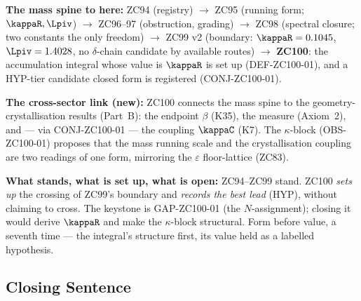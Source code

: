 \documentclass[12pt, a4paper]{article}
\begin{document}
\begin{genealogybox}[title={How ZC100 Sits in the Corpus --- Setting Up the
  Crossing}]
\textbf{The mass spine to here:}
ZC94 (registry) $\to$ ZC95 (running form; $\kappaR,\Lpiv$) $\to$ ZC96--97
(obstruction, grading) $\to$ ZC98 (spectral closure; two constants the only
freedom) $\to$ ZC99 v2 (boundary: $\kappaR=0.1045$, $\Lpiv=1.4028$, no
$\delta$-chain candidate by available routes) $\to$ \textbf{ZC100}: the
accumulation integral whose value is $\kappaR$ is set up (DEF-ZC100-01), and a
HYP-tier candidate closed form is registered (CONJ-ZC100-01).

\textbf{The cross-sector link (new):}
ZC100 connects the mass spine to the geometry-crystallisation results (Part~B):
the endpoint $\beta$ (K35), the measure (Axiom~2), and --- via CONJ-ZC100-01 ---
the coupling $\kappaC$ (K7). The $\kappa$-block (OBS-ZC100-01) proposes that the
mass running scale and the crystallisation coupling are two readings of one
form, mirroring the $\varepsilon$ floor-lattice (ZC83).

\textbf{What stands, what is set up, what is open:}
ZC94--ZC99 stand. ZC100 \emph{sets up} the crossing of ZC99's boundary and
\emph{records the best lead} (HYP), without claiming to cross. The keystone is
GAP-ZC100-01 (the $N$-assignment); closing it would derive $\kappaR$ and make
the $\kappa$-block structural. Form before value, a seventh time --- the
integral's structure first, its value held as a labelled hypothesis.
\end{genealogybox}

\subsection{Closing Sentence}
\end{document}
